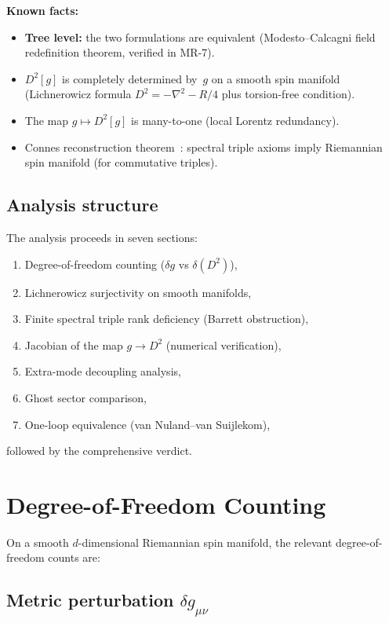 \documentclass[12pt,a4paper]{article}
\theoremstyle{definition}
\theoremstyle{remark}
\begin{document}
\medskip
\noindent\textbf{Known facts:}
\begin{itemize}
  \item \textbf{Tree level:} the two formulations are equivalent
    (Modesto--Calcagni field redefinition theorem, verified in MR-7).
  \item $D^2[g]$ is completely determined by~$g$ on a smooth spin manifold
    (Lichnerowicz formula $D^2 = -\nabla^2 - R/4$ plus torsion-free condition).
  \item The map $g \mapsto D^2[g]$ is many-to-one (local Lorentz redundancy).
  \item Connes reconstruction theorem~\cite{Connes2008}: spectral triple
    axioms imply Riemannian spin manifold (for commutative triples).
\end{itemize}

\subsection{Analysis structure}

The analysis proceeds in seven sections:
\begin{enumerate}
  \item Degree-of-freedom counting ($\delta g$ vs $\delta(D^2)$),
  \item Lichnerowicz surjectivity on smooth manifolds,
  \item Finite spectral triple rank deficiency (Barrett obstruction),
  \item Jacobian of the map $g \to D^2$ (numerical verification),
  \item Extra-mode decoupling analysis,
  \item Ghost sector comparison,
  \item One-loop equivalence (van Nuland--van Suijlekom),
\end{enumerate}
followed by the comprehensive verdict.

\section{Degree-of-Freedom Counting}
\label{sec:dof}

On a smooth $d$-dimensional Riemannian spin manifold, the relevant
degree-of-freedom counts are:

\subsection{Metric perturbation $\delta g_{\mu\nu}$}
\end{document}
